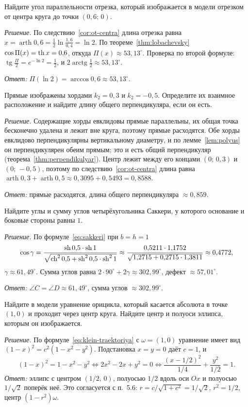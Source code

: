 \begin{task}
Найдите угол параллельности отрезка, который изображается в модели отрезком от центра круга до точки $(0{,}6;\,0)$.
\end{task}
\textit{Решение.} По следствию~\ref{cor:ot-centra} длина отрезка равна $x=\operatorname{arth}0{,}6=\tfrac12\ln\tfrac{1{,}6}{0{,}4}=\ln2$. По теореме~\ref{thm:lobachevsky} $\cos\Pi(x)=\operatorname{th} x=0{,}6$, откуда $\Pi(x)\approx53{,}13^\circ$. Проверка по второй формуле: $\operatorname{tg}\frac{\Pi}{2}=e^{-\ln2}=\frac12$, и $2\operatorname{arctg}\frac12\approx53{,}13^\circ$.

\textit{Ответ:} $\Pi(\ln 2)=\arccos0{,}6\approx53{,}13^\circ$.

\begin{task}
Прямые изображены хордами $k_2=0{,}3$ и $k_2=-0{,}5$. Определите их взаимное расположение и найдите длину общего перпендикуляра, если он есть.
\end{task}
\textit{Решение.} Содержащие хорды евклидовы прямые параллельны, их общая точка бесконечно удалена и лежит вне круга, поэтому прямые расходятся. Обе хорды евклидово перпендикулярны вертикальному диаметру, и по лемме~\ref{lem:polyus} он перпендикулярен обеим прямым; это и есть общий перпендикуляр (теорема~\ref{thm:perpendikulyar}). Центр лежит между его концами $(0;\,0{,}3)$ и $(0;\,-0{,}5)$, поэтому по следствию~\ref{cor:ot-centra} длина равна $\operatorname{arth}0{,}3+\operatorname{arth}0{,}5\approx0{,}3095+0{,}5493=0{,}8588$.

\textit{Ответ:} прямые расходятся, длина общего перпендикуляра $\approx0{,}859$.

\begin{task}
Найдите углы и сумму углов четырёхугольника Саккери, у которого основание и боковые стороны равны $1$.
\end{task}
\textit{Решение.} По формуле~\eqref{eq:sakkeri} при $b=h=1$
\[
\cos\gamma=\frac{\operatorname{sh}0{,}5\cdot\operatorname{sh}1}{\sqrt{\operatorname{ch}^20{,}5+\operatorname{sh}^20{,}5\cdot\operatorname{sh}^21}}\approx\frac{0{,}5211\cdot1{,}1752}{\sqrt{1{,}2715+0{,}2715\cdot1{,}3811}}\approx0{,}4772,
\]
$\gamma\approx61{,}49^\circ$. Сумма углов равна $2\cdot90^\circ+2\gamma\approx302{,}99^\circ$, дефект $\approx57{,}01^\circ$.

\textit{Ответ:} $\angle C=\angle D\approx61{,}49^\circ$, сумма углов $\approx302{,}99^\circ$.

\begin{task}
Найдите в модели уравнение орицикла, который касается абсолюта в точке $(1,0)$ и проходит через центр круга. Найдите центр и полуоси эллипса, которым он изображается.
\end{task}
\textit{Решение.} По формуле~\eqref{eq:klein-traektoriya} с $\omega=(1,0)$ уравнение имеет вид $(1-x)^2=c^2(1-x^2-y^2)$. Подстановка $x=y=0$ даёт $c=1$, и
\[
(1-x)^2=1-x^2-y^2\iff 2x^2-2x+y^2=0\iff\frac{(x-1/2)^2}{1/4}+\frac{y^2}{1/2}=1.
\]
\textit{Ответ:} эллипс с центром $(1/2,\,0)$, полуосью $1/2$ вдоль оси $Ox$ и полуосью $1/\sqrt2$ поперёк неё. Это согласуется с п.~5.6: $r=c/\sqrt{1+c^2}=1/\sqrt2$, $r^2=1/2$, центр $(1-r^2)\omega$.

